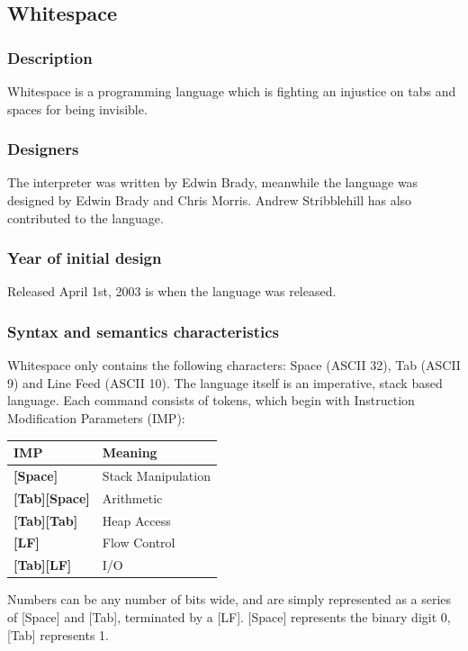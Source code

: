 \documentclass[12pt]{article}
\begin{document}
\subsection{Whitespace}
\subsubsection{Description}
Whitespace is a programming language which is fighting an injustice on tabs and spaces for being invisible.
\subsubsection*{Designers}
The interpreter was written by Edwin Brady, meanwhile the language was designed by Edwin Brady and Chris Morris.
Andrew Stribblehill has also contributed to the language.
\subsubsection*{Year of initial design}
Released April 1st, 2003 is when the language was released.
\subsubsection*{Syntax and semantics characteristics}
Whitespace only contains the following characters: Space (ASCII 32), Tab (ASCII 9) and Line Feed (ASCII 10).
The language itself is an imperative, stack based language.
Each command consists of tokens, which begin with Instruction Modification Parameters (IMP):
\begin{center}
    \begin{tabular}{|l|l|}
        \hline
        \textbf{IMP} & \textbf{Meaning} \\
        \hline
        \textbf{[Space]} & Stack Manipulation \\
        \hline
        \textbf{[Tab][Space]} & Arithmetic \\
        \hline
        \textbf{[Tab][Tab]} & Heap Access \\
        \hline
        \textbf{[LF]} & Flow Control \\
        \hline
        \textbf{[Tab][LF]} & I/O \\
        \hline
    \end{tabular}
\end{center}
Numbers can be any number of bits wide, and are simply represented as a series of [Space] and [Tab], terminated by a [LF]. [Space] represents the binary digit 0, [Tab] represents 1.
\cite{Question3Whitespace}
\end{document}
